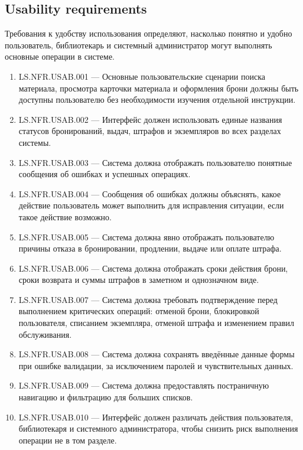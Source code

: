 \documentclass[12pt,a4paper]{article}
\begin{document}
	\subsection{Usability requirements}
	
	Требования к удобству использования определяют, насколько понятно и удобно
	пользователь, библиотекарь и системный администратор могут выполнять основные
	операции в системе.
	
	\begin{enumerate}
		\item LS.NFR.USAB.001 --- Основные пользовательские сценарии поиска материала,
		просмотра карточки материала и оформления брони должны быть доступны
		пользователю без необходимости изучения отдельной инструкции.
		
		\item LS.NFR.USAB.002 --- Интерфейс должен использовать единые названия
		статусов бронирований, выдач, штрафов и экземпляров во всех разделах системы.
		
		\item LS.NFR.USAB.003 --- Система должна отображать пользователю понятные
		сообщения об ошибках и успешных операциях.
		
		\item LS.NFR.USAB.004 --- Сообщения об ошибках должны объяснять, какое действие
		пользователь может выполнить для исправления ситуации, если такое действие
		возможно.
		
		\item LS.NFR.USAB.005 --- Система должна явно отображать пользователю причины
		отказа в бронировании, продлении, выдаче или оплате штрафа.
		
		\item LS.NFR.USAB.006 --- Система должна отображать сроки действия брони,
		сроки возврата и суммы штрафов в заметном и однозначном виде.
		
		\item LS.NFR.USAB.007 --- Система должна требовать подтверждение перед выполнением
		критических операций: отменой брони, блокировкой пользователя, списанием
		экземпляра, отменой штрафа и изменением правил обслуживания.
		
		\item LS.NFR.USAB.008 --- Система должна сохранять введённые данные формы
		при ошибке валидации, за исключением паролей и чувствительных данных.
		
		\item LS.NFR.USAB.009 --- Система должна предоставлять постраничную навигацию
		и фильтрацию для больших списков.
		
		\item LS.NFR.USAB.010 --- Интерфейс должен различать действия пользователя,
		библиотекаря и системного администратора, чтобы снизить риск выполнения
		операции не в том разделе.
	\end{enumerate}
	
\end{document}
